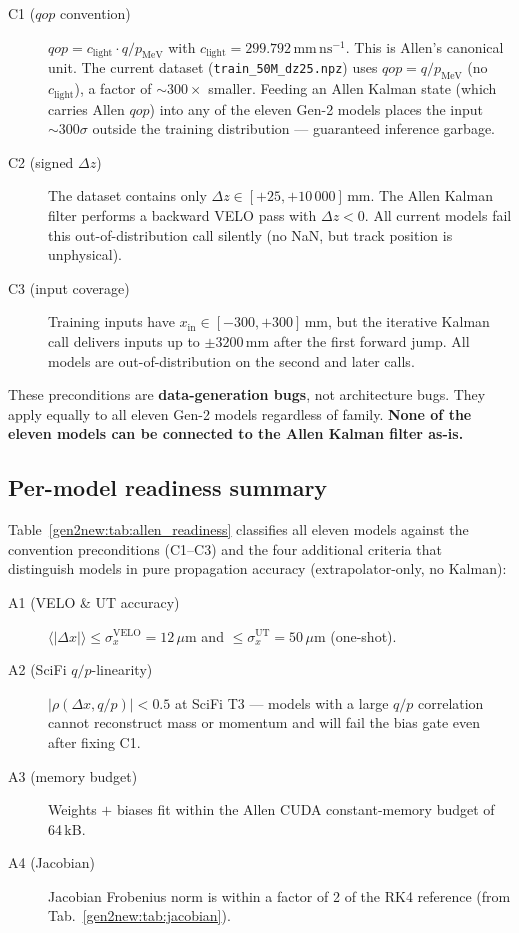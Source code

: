 \documentclass[a4paper,11pt]{article}
\begin{document}
\begin{description}
  \item[C1 ($qop$ convention)] $qop = c_\text{light}\cdot q / p_\text{MeV}$
        with $c_\text{light}=299.792\,\mathrm{mm\,ns^{-1}}$.  This is
        Allen's canonical unit.  The current dataset
        (\texttt{train\_50M\_dz25.npz}) uses
        $qop = q/p_\text{MeV}$ (no $c_\text{light}$), a factor of
        $\sim300\times$ smaller.  Feeding an Allen Kalman state
        (which carries Allen $qop$) into any of the eleven Gen-2
        models places the input $\sim300\sigma$ outside the training
        distribution --- guaranteed inference garbage.
  \item[C2 (signed $\Delta z$)] The dataset contains only
        $\Delta z \in [+25, +10\,000]$\,mm.  The Allen Kalman filter
        performs a backward VELO pass with $\Delta z < 0$.  All
        current models fail this out-of-distribution call silently
        (no NaN, but track position is unphysical).
  \item[C3 (input coverage)] Training inputs have $x_\text{in}\in
        [-300, +300]$\,mm, but the iterative Kalman call delivers
        inputs up to $\pm 3200$\,mm after the first forward jump.
        All models are out-of-distribution on the second and later
        calls.
\end{description}
These preconditions are \textbf{data-generation bugs}, not
architecture bugs.  They apply equally to all eleven Gen-2 models
regardless of family.  \textbf{None of the eleven models can be
connected to the Allen Kalman filter as-is.}

\subsection{Per-model readiness summary}

Table~\ref{gen2new:tab:allen_readiness} classifies all eleven models
against the convention preconditions (C1--C3) and the four additional
criteria that distinguish models in pure propagation accuracy
(extrapolator-only, no Kalman):

\begin{description}
  \item[A1 (VELO \& UT accuracy)] $\langle|\Delta x|\rangle \leq
        \sigma_x^\text{VELO}=12\,\mu\text{m}$ and
        $\leq\sigma_x^\text{UT}=50\,\mu\text{m}$ (one-shot).
  \item[A2 (SciFi $q/p$-linearity)] $|\rho(\Delta x, q/p)| < 0.5$
        at SciFi T3 --- models with a large $q/p$ correlation cannot
        reconstruct mass or momentum and will fail the bias gate
        even after fixing C1.
  \item[A3 (memory budget)] Weights $+$ biases fit within the Allen
        CUDA constant-memory budget of 64\,kB.
  \item[A4 (Jacobian)]  Jacobian Frobenius norm is within a factor
        of 2 of the RK4 reference (from
        Tab.~\ref{gen2new:tab:jacobian}).
\end{description}
\end{document}
